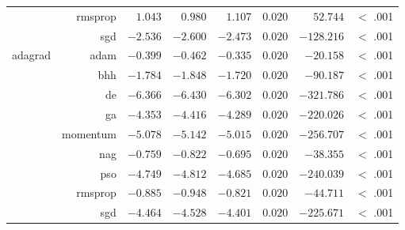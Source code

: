 \begin{table}[htbp]
{\begin{tabular}{lrrrrrrr}
			                     & rmsprop              & $1.043$              & $0.980$                                         & $1.107$              & $0.020$              & $52.744$             & $<$ .001    \\
			                     & sgd                  & $-2.536$             & $-2.600$                                        & $-2.473$             & $0.020$              & $-128.216$           & $<$ .001    \\
			adagrad              & adam                 & $-0.399$             & $-0.462$                                        & $-0.335$             & $0.020$              & $-20.158$            & $<$ .001    \\
			$ $                  & bhh                  & $-1.784$             & $-1.848$                                        & $-1.720$             & $0.020$              & $-90.187$            & $<$ .001    \\
			                     & de                   & $-6.366$             & $-6.430$                                        & $-6.302$             & $0.020$              & $-321.786$           & $<$ .001    \\
			                     & ga                   & $-4.353$             & $-4.416$                                        & $-4.289$             & $0.020$              & $-220.026$           & $<$ .001    \\
			                     & momentum             & $-5.078$             & $-5.142$                                        & $-5.015$             & $0.020$              & $-256.707$           & $<$ .001    \\
			                     & nag                  & $-0.759$             & $-0.822$                                        & $-0.695$             & $0.020$              & $-38.355$            & $<$ .001    \\
			                     & pso                  & $-4.749$             & $-4.812$                                        & $-4.685$             & $0.020$              & $-240.039$           & $<$ .001    \\
			                     & rmsprop              & $-0.885$             & $-0.948$                                        & $-0.821$             & $0.020$              & $-44.711$            & $<$ .001    \\
			                     & sgd                  & $-4.464$             & $-4.528$                                        & $-4.401$             & $0.020$              & $-225.671$           & $<$ .001    \\

\end{tabular}}
\end{table}
